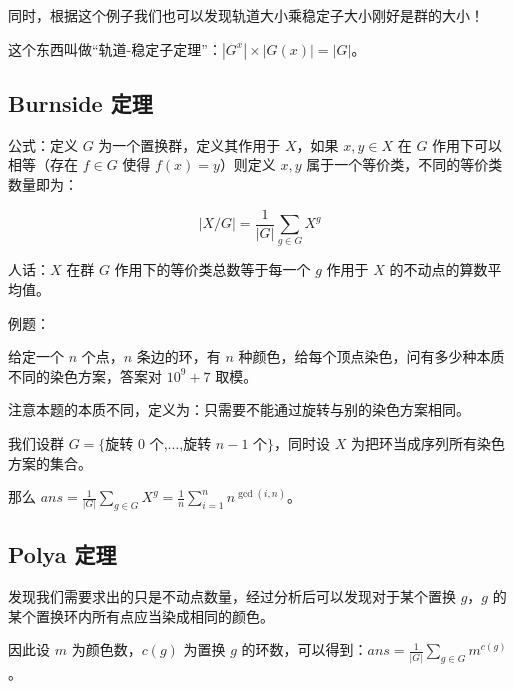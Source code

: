 同时，根据这个例子我们也可以发现轨道大小乘稳定子大小刚好是群的大小！

这个东西叫做“轨道-稳定子定理”：$|G^x| \times |G(x)|=|G|$。

\subsection{Burnside 定理}

公式：定义 $G$ 为一个置换群，定义其作用于 $X$，如果 $x,y \in X$ 在 $G$ 作用下可以相等（存在 $f \in G$ 使得 $f(x)=y$）则定义 $x,y$ 属于一个等价类，不同的等价类数量即为：

$$|X/G|=\frac{1}{|G|}\sum_{g \in G}X^g$$

人话：$X$ 在群 $G$ 作用下的等价类总数等于每一个 $g$ 作用于 $X$ 的不动点的算数平均值。

例题：

给定一个 $n$ 个点，$n$ 条边的环，有 $n$ 种颜色，给每个顶点染色，问有多少种本质不同的染色方案，答案对 $10^9+7$ 取模。

注意本题的本质不同，定义为：只需要不能通过旋转与别的染色方案相同。

我们设群 $G=\{$旋转 $0$ 个,$\dots$,旋转 $n-1$ 个$\}$，同时设 $X$ 为把环当成序列所有染色方案的集合。

那么 $ans=\frac{1}{|G|} \sum_{g \in G} X^g=\frac{1}{n} \sum_{i=1}^n n^{\gcd(i,n)}$。

\subsection{Polya 定理}

发现我们需要求出的只是不动点数量，经过分析后可以发现对于某个置换 $g$，$g$ 的某个置换环内所有点应当染成相同的颜色。

因此设 $m$ 为颜色数，$c(g)$ 为置换 $g$ 的环数，可以得到：$ans=\frac{1}{|G|} \sum_{g \in G} m^{c(g)}$。